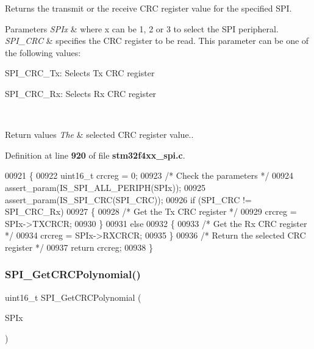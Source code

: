 Returns the transmit or the receive C\+RC register value for the specified S\+PI. 


\begin{DoxyParams}{Parameters}
{\em S\+P\+Ix} & where x can be 1, 2 or 3 to select the S\+PI peripheral. \\
\hline
{\em S\+P\+I\+\_\+\+C\+RC} & specifies the C\+RC register to be read. This parameter can be one of the following values\+: \begin{DoxyItemize}
\item S\+P\+I\+\_\+\+C\+R\+C\+\_\+\+Tx\+: Selects Tx C\+RC register \item S\+P\+I\+\_\+\+C\+R\+C\+\_\+\+Rx\+: Selects Rx C\+RC register \end{DoxyItemize}
\\
\hline
\end{DoxyParams}

\begin{DoxyRetVals}{Return values}
{\em The} & selected C\+RC register value.. \\
\hline
\end{DoxyRetVals}


Definition at line \textbf{ 920} of file \textbf{ stm32f4xx\+\_\+spi.\+c}.


\begin{DoxyCode}
00921 \{
00922   uint16\_t crcreg = 0;
00923   \textcolor{comment}{/* Check the parameters */}
00924   assert_param(IS_SPI_ALL_PERIPH(SPIx));
00925   assert_param(IS_SPI_CRC(SPI\_CRC));
00926   \textcolor{keywordflow}{if} (SPI\_CRC != SPI_CRC_Rx)
00927   \{
00928     \textcolor{comment}{/* Get the Tx CRC register */}
00929     crcreg = SPIx->TXCRCR;
00930   \}
00931   \textcolor{keywordflow}{else}
00932   \{
00933     \textcolor{comment}{/* Get the Rx CRC register */}
00934     crcreg = SPIx->RXCRCR;
00935   \}
00936   \textcolor{comment}{/* Return the selected CRC register */}
00937   \textcolor{keywordflow}{return} crcreg;
00938 \}
\end{DoxyCode}
\mbox{\label{group__SPI__Group3_ga80fb9374cfce670f29128bb78568353f}} 
\subsubsection{S\+P\+I\+\_\+\+Get\+C\+R\+C\+Polynomial()}
{\footnotesize\ttfamily uint16\+\_\+t S\+P\+I\+\_\+\+Get\+C\+R\+C\+Polynomial (\begin{DoxyParamCaption}\item[{\textbf{ S\+P\+I\+\_\+\+Type\+Def} $\ast$}]{S\+P\+Ix }\end{DoxyParamCaption})}



